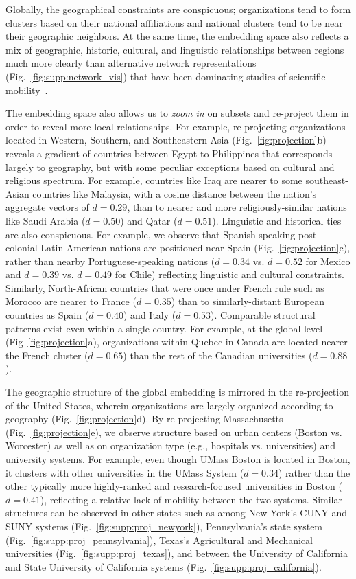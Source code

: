 \documentclass[12pt]{article} %
\begin{document}
Globally, the geographical constraints are conspicuous; organizations tend to form clusters based on their national affiliations and national clusters tend to be near their geographic neighbors.
At the same time, the embedding space also reflects a mix of geographic, historic, cultural, and linguistic relationships between regions much more clearly than alternative network representations (Fig.~\ref{fig:supp:network_vis}) that have been dominating studies of scientific mobility~\autocite{chinchilla2018global, czaika2018globalisation}.

The embedding space also allows us to \textit{zoom in} on subsets and re-project them in order to reveal more local relationships.
For example, re-projecting organizations located in Western, Southern, and Southeastern Asia (Fig.~\ref{fig:projection}b) reveals a gradient of countries between Egypt to Philippines that corresponds largely to geography, but with some peculiar exceptions based on cultural and religious spectrum.
For example, countries like Iraq are nearer to some southeast-Asian countries like Malaysia, with a cosine distance between the nation's aggregate vectors of $d = 0.29$, than to nearer and more religiously-similar nations like Saudi Arabia ($d = 0.50$) and Qatar ($d = 0.51$).
Linguistic and historical ties are also conspicuous.
For example, we observe that Spanish-speaking post-colonial Latin American nations are positioned near Spain (Fig.~\ref{fig:projection}c), rather than nearby Portuguese-speaking nations ($d = 0.34$ vs. $d = 0.52$ for Mexico and $d = 0.39$ vs. $d = 0.49$ for Chile) reflecting linguistic and cultural constraints.
Similarly, North-African countries that were once under French rule such as Morocco are nearer to France ($d =0.35$) than to similarly-distant European countries as Spain ($d = 0.40$) and Italy ($d = 0.53$).
Comparable structural patterns exist even within a single country.
For example, at the global level (Fig~\ref{fig:projection}a), organizations within Quebec in Canada are located nearer the French cluster ($d = 0.65$) than the rest of the Canadian universities ($d = 0.88$).


The geographic structure of the global embedding is mirrored in the re-projection of the United States, wherein organizations are largely organized according to geography (Fig.~\ref{fig:projection}d).
By re-projecting Massachusetts (Fig.~\ref{fig:projection}e), we observe structure based on urban centers (Boston vs. Worcester) as well as on organization type (e.g., hospitals vs. universities) and university systems.
For example, even though UMass Boston is located in Boston, it clusters with  other universities in the UMass System ($d = 0.34$) rather than the other typically more highly-ranked and research-focused universities in Boston ($d = 0.41$), reflecting a relative lack of mobility between the two systems.
Similar structures can be observed in other states such as among New York's CUNY and SUNY systems (Fig.~\ref{fig:supp:proj_newyork}), Pennsylvania's state system (Fig.~\ref{fig:supp:proj_pennsylvania}), Texas's Agricultural and Mechanical universities (Fig.~\ref{fig:supp:proj_texas}), and between the University of California and State University of California systems (Fig.~\ref{fig:supp:proj_california}).
\end{document}

